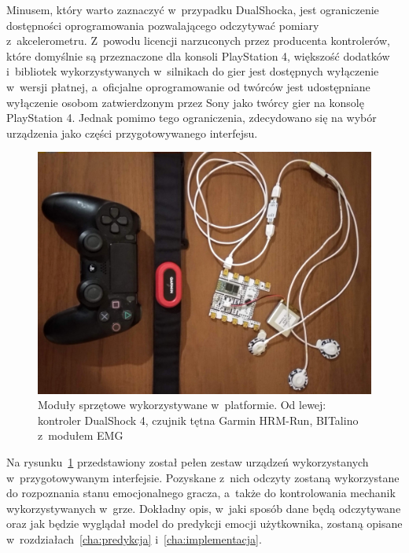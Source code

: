 Minusem, który warto zaznaczyć w~przypadku DualShocka, jest ograniczenie dostępności oprogramowania pozwalającego odczytywać pomiary z~akcelerometru. Z~powodu licencji narzuconych przez producenta kontrolerów, które domyślnie są przeznaczone dla konsoli PlayStation 4, większość dodatków i~bibliotek wykorzystywanych w~silnikach do gier jest dostępnych wyłączenie w~wersji płatnej, a~oficjalne oprogramowanie od twórców jest udostępniane wyłączenie osobom zatwierdzonym przez Sony jako twórcy gier na konsolę PlayStation 4. Jednak pomimo tego ograniczenia, zdecydowano się na wybór urządzenia jako części przygotowywanego interfejsu.

\begin{figure}
	\centering
	\includegraphics[width=0.7\linewidth]{images/hardware.jpg}
	\caption{Moduły sprzętowe wykorzystywane w~platformie. Od lewej: kontroler DualShock 4, czujnik tętna Garmin HRM-Run, BITalino z~modułem EMG}
	\label{fig:hardware}
\end{figure}

Na rysunku~\ref{fig:hardware} przedstawiony został pełen zestaw urządzeń wykorzystanych w~przygotowywanym interfejsie. Pozyskane z~nich odczyty zostaną wykorzystane do rozpoznania stanu emocjonalnego gracza, a~także do kontrolowania mechanik wykorzystywanych w~grze. Dokładny opis, w~jaki sposób dane będą odczytywane oraz jak będzie wyglądał model do predykcji emocji użytkownika, zostaną opisane w~rozdziałach~\ref{cha:predykcja} i~\ref{cha:implementacja}.